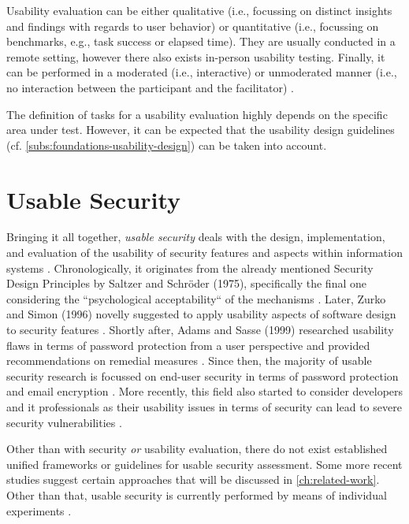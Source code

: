 Usability evaluation can be either qualitative (i.e., focussing on distinct insights and findings with regards to user behavior) or quantitative (i.e., focussing on benchmarks, e.g., task success or elapsed time). They are usually conducted in a remote setting, however there also exists in-person usability testing. Finally, it can be performed in a moderated (i.e., interactive) or unmoderated manner (i.e., no interaction between the participant and the facilitator) \cite{moran_usability_2019}.

The definition of tasks for a usability evaluation highly depends on the specific area under test. However, it can be expected that the usability design guidelines (cf. \autoref{subs:foundations-usability-design}) can be taken into account.

\section{Usable Security} \label{sec:foundation-usable_security}

Bringing it all together, \textit{usable security} deals with the design, implementation, and evaluation of the usability of security features and aspects within information systems \cite{reuter_quarter_2022}. Chronologically, it originates from the already mentioned Security Design Principles by Saltzer and Schröder (1975), specifically the final one considering the ``psychological acceptability`` of the mechanisms \cites{reuter_quarter_2022}{saltzer_protection_1975}. Later, Zurko and Simon (1996) novelly suggested to apply usability aspects of software design to security features \cite{zurko_user-centered_1996}. Shortly after, Adams and Sasse (1999) researched usability flaws in terms of password protection from a user perspective and provided recommendations on remedial measures \cite{adams_users_1999}. Since then, the majority of usable security research is focussed on end-user security in terms of password protection and email encryption \cites{reuter_quarter_2022}{whitten_why_1999}. More recently, this field also started to consider developers and \ac{it} professionals as their usability issues in terms of security can lead to severe security vulnerabilities \cite{chiasson_even_2007-1}.

Other than with security \textit{or} usability evaluation, there do not exist established unified frameworks or guidelines for usable security assessment. Some more recent studies suggest certain approaches that will be discussed in \autoref{ch:related-work}. Other than that, usable security is currently performed by means of individual experiments \cite{garfinkel_usable_2014}.

